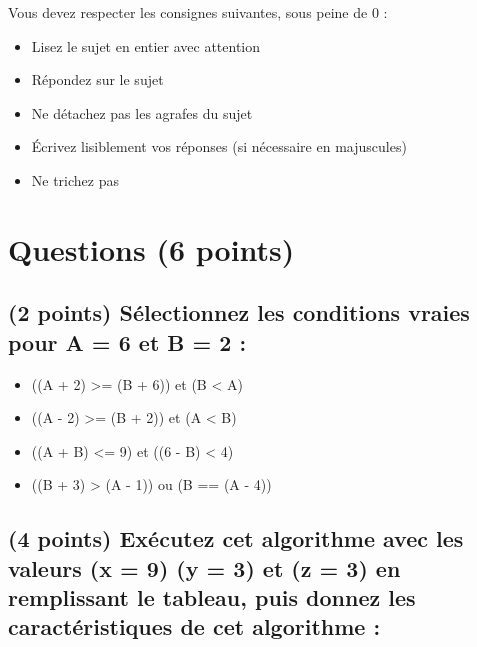 \documentclass[11pt,a4paper]{article}
\begin{document}
\MakeExamTitle                   %


\bigskip

Vous devez respecter les consignes suivantes, sous peine de 0 :

\begin{itemize}
\item Lisez le sujet en entier avec attention
\item Répondez sur le sujet
\item Ne détachez pas les agrafes du sujet
\item \'Ecrivez lisiblement vos réponses (si nécessaire en majuscules)
\item Ne trichez pas
\end{itemize}



\section{Questions (6 points)}

\subsection{(2 points) Sélectionnez les conditions vraies pour A = 6 et B = 2 : }

\bigskip

\begin{itemize}  
  \item[\CaseCoche] ((A + 2) >= (B + 6)) et (B < A)   %
  \item[\CaseCoche] ((A - 2) >= (B + 2)) et (A < B)   %
  \item[\CaseCoche] ((A + B) <= 9) et ((6 - B) < 4)   %
  \item[\CaseCoche] ((B + 3) > (A - 1)) ou (B == (A - 4)) %
\end{itemize}


\medskip


\subsection{(4 points) Exécutez cet algorithme avec les valeurs (x = 9) (y = 3) et (z = 3) en remplissant le tableau, puis donnez les caractéristiques de cet algorithme : }
\end{document}
